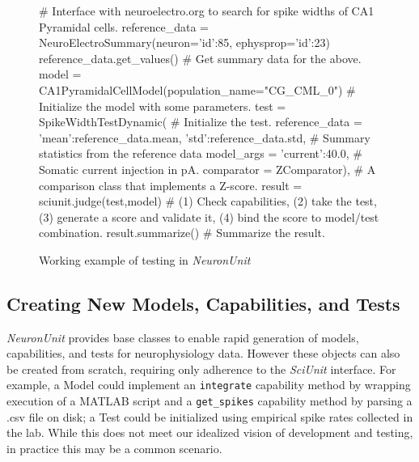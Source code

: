 \documentclass{frontiersSCNS}
\let\verbx\lstinline
\begin{document}
\begin{figure}
\begin{python}
# Interface with neuroelectro.org to search for spike widths of CA1 Pyramidal cells. 
reference_data = NeuroElectroSummary(neuron={'id':85}, ephysprop={'id':23})
reference_data.get_values()  # Get summary data for the above. 
model = CA1PyramidalCellModel(population_name="CG_CML_0") # Initialize the model with some parameters.
test = SpikeWidthTestDynamic( # Initialize the test.    
	reference_data = {'mean':reference_data.mean, 'std':reference_data.std}, # Summary statistics from the reference data
	model_args = {'current':40.0}, # Somatic current injection in pA.  
	comparator = ZComparator), # A comparison class that implements a Z-score.  
result = sciunit.judge(test,model) # (1) Check capabilities, (2) take the test, (3) generate a score and validate it, (4) bind the score to model/test combination. 
result.summarize() # Summarize the result.  
\end{python}
\caption{Working example of testing in \textit{NeuronUnit}}
\label{fig:neuronunit_example}
\vspace{-15px}
\end{figure}

\subsection{Creating New Models, Capabilities, and Tests}
\textit{NeuronUnit} provides base classes to enable rapid generation of models, capabilities, and tests for neurophysiology data. 
However these objects can also be created from scratch, requiring only adherence to the \textit{SciUnit} interface. 
For example, a Model could implement an \verbx{integrate} capability method by wrapping execution of a MATLAB script and a \verbx{get_spikes} capability method by parsing a .csv file on disk; 
a Test could be initialized using empirical spike rates collected in the lab.  
While this does not meet our idealized vision of development and testing, in practice this may be a common scenario. 
\end{document}
